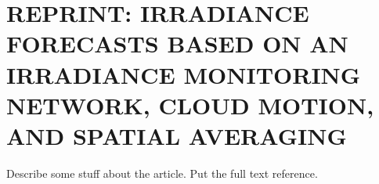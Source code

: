 \chapter{REPRINT: IRRADIANCE FORECASTS BASED ON AN IRRADIANCE MONITORING NETWORK, CLOUD MOTION, AND SPATIAL AVERAGING}
\label{networkForecastAppendix}
Describe some stuff about the article. Put the full text reference.

\newcommand{\figNF}[1]{
\begin{figure}
\texttt{[image: LorenzoSENF/\#1]}
\end{figure}
}




